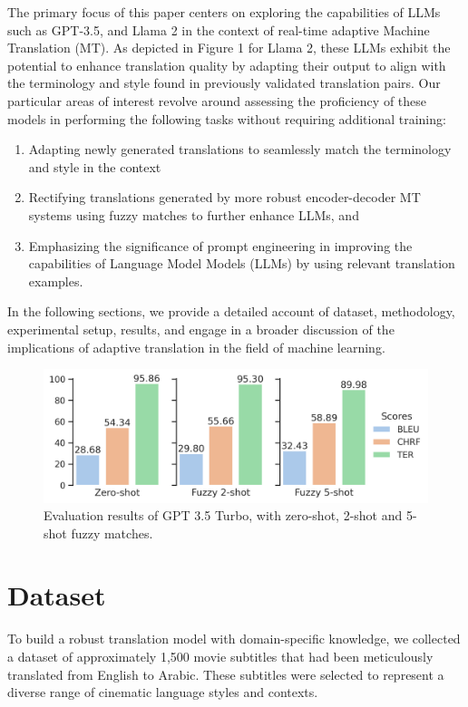 \documentclass[twocolumn]{article}
\begin{document}
The primary focus of this paper centers on exploring the capabilities of LLMs such as GPT-3.5, and Llama 2 in the context of real-time adaptive Machine Translation (MT). As depicted in Figure 1 for Llama 2, these LLMs exhibit the potential to enhance translation quality by adapting their output to align with the terminology and style found in previously validated translation pairs. Our particular areas of interest revolve around assessing the proficiency of these models in performing the following tasks without requiring additional training:


\begin{enumerate}
\item Adapting newly generated translations to seamlessly match the terminology and style in the context

\item Rectifying translations generated by more robust encoder-decoder MT systems using fuzzy matches to further enhance LLMs, and

\item Emphasizing the significance of prompt engineering in improving the capabilities of Language Model Models (LLMs) by using relevant translation examples. 

\end{enumerate}

In the following sections, we provide a detailed account of dataset, methodology, experimental setup, results, and engage in a broader discussion of the implications of adaptive translation in the field of machine learning. 




\begin{figure}
\centering
\includegraphics[width=\linewidth, ]{figs/chagpt_3_5_evaluation} %
\caption{ Evaluation results of GPT 3.5 Turbo, with zero-shot, 2-shot and 5-shot fuzzy matches.}

\label{chagpt_3_5_evaluation:duck}
\end{figure}

\section{Dataset}
To build a robust translation model with domain-specific knowledge, we collected a dataset of approximately 1,500 movie subtitles that had been meticulously translated from English to Arabic. These subtitles were selected to represent a diverse range of cinematic language styles and contexts. 
\end{document}
